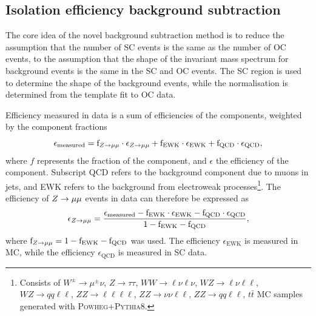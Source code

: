 \subsection{Isolation efficiency background subtraction}

The core idea of the novel background subtraction method is to
reduce the assumption that the number of SC events is the same as
the number of OC events, to the assumption that the shape of the
invariant mass spectrum for background events is the same in the
SC and OC events. The SC region is used to determine the shape
of the background events, while the normalisation is determined
from the template fit to OC data.

Efficiency measured in data is a sum of efficiencies of the
components, weighted by the component fractions
\begin{equation}
\epsilon_\text{measured} =
\text{f}_{Z \rightarrow \mu\mu}   \cdot \epsilon_{Z \rightarrow \mu\mu} +
\text{f}_\text{EWK} \cdot \epsilon_\text{EWK} + 
\text{f}_\text{QCD} \cdot \epsilon_\text{QCD},
\end{equation}
where $f$ represents the fraction of the component, and $\epsilon$
the efficiency of the component. Subscript QCD refers to the
background component due to muons in jets, and EWK refers to the
background from electroweak processes\footnote{Consists of
$W^\pm\rightarrow\mu^\pm \nu$, $Z\rightarrow \tau\tau$,
$WW\rightarrow \ell \nu \ell \nu$, $WZ\rightarrow \ell \nu \ell \ell$,
$WZ\rightarrow qq \ell \ell$, $ZZ\rightarrow\ell\ell\ell\ell$,
$ZZ\rightarrow\nu\nu\ell\ell$, $ZZ\rightarrow qq\ell\ell$,
$t\bar t$ MC samples generated with \textsc{Powheg}+\textsc{Pythia}8.}.
The efficiency of $Z \rightarrow \mu\mu$ events in data can therefore be expressed as
\begin{equation}
\epsilon_{Z \rightarrow \mu\mu} = \frac
{\epsilon_\text{measured} - \text{f}_\text{EWK} \cdot \epsilon_\text{EWK} - \text{f}_\text{QCD} \cdot \epsilon_\text{QCD}}
{1 - \text{f}_\text{EWK} - \text{f}_\text{QCD}},
\end{equation}
where $\text{f}_{Z \rightarrow \mu\mu} = 1 - \text{f}_\text{EWK} - \text{f}_\text{QCD}$
was used. The efficiency $\epsilon_\text{EWK}$ is measured in MC,
while the efficiency $\epsilon_\text{QCD}$ is measured in SC data.

